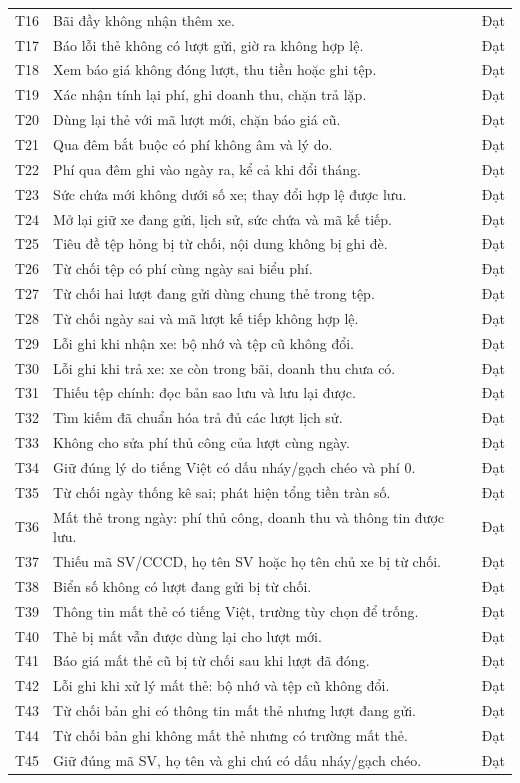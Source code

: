 \begin{longtable}{p{0.85cm} p{11.9cm} p{1.2cm}}
T16 & Bãi đầy không nhận thêm xe. & Đạt\\
T17 & Báo lỗi thẻ không có lượt gửi, giờ ra không hợp lệ. & Đạt\\
T18 & Xem báo giá không đóng lượt, thu tiền hoặc ghi tệp. & Đạt\\
T19 & Xác nhận tính lại phí, ghi doanh thu, chặn trả lặp. & Đạt\\
T20 & Dùng lại thẻ với mã lượt mới, chặn báo giá cũ. & Đạt\\
T21 & Qua đêm bắt buộc có phí không âm và lý do. & Đạt\\
T22 & Phí qua đêm ghi vào ngày ra, kể cả khi đổi tháng. & Đạt\\
T23 & Sức chứa mới không dưới số xe; thay đổi hợp lệ được lưu. & Đạt\\
T24 & Mở lại giữ xe đang gửi, lịch sử, sức chứa và mã kế tiếp. & Đạt\\
T25 & Tiêu đề tệp hỏng bị từ chối, nội dung không bị ghi đè. & Đạt\\
T26 & Từ chối tệp có phí cùng ngày sai biểu phí. & Đạt\\
T27 & Từ chối hai lượt đang gửi dùng chung thẻ trong tệp. & Đạt\\
T28 & Từ chối ngày sai và mã lượt kế tiếp không hợp lệ. & Đạt\\
T29 & Lỗi ghi khi nhận xe: bộ nhớ và tệp cũ không đổi. & Đạt\\
T30 & Lỗi ghi khi trả xe: xe còn trong bãi, doanh thu chưa có. & Đạt\\
T31 & Thiếu tệp chính: đọc bản sao lưu và lưu lại được. & Đạt\\
T32 & Tìm kiếm đã chuẩn hóa trả đủ các lượt lịch sử. & Đạt\\
T33 & Không cho sửa phí thủ công của lượt cùng ngày. & Đạt\\
T34 & Giữ đúng lý do tiếng Việt có dấu nháy/gạch chéo và phí 0. & Đạt\\
T35 & Từ chối ngày thống kê sai; phát hiện tổng tiền tràn số. & Đạt\\
T36 & Mất thẻ trong ngày: phí thủ công, doanh thu và thông tin được lưu. & Đạt\\
T37 & Thiếu mã SV/CCCD, họ tên SV hoặc họ tên chủ xe bị từ chối. & Đạt\\
T38 & Biển số không có lượt đang gửi bị từ chối. & Đạt\\
T39 & Thông tin mất thẻ có tiếng Việt, trường tùy chọn để trống. & Đạt\\
T40 & Thẻ bị mất vẫn được dùng lại cho lượt mới. & Đạt\\
T41 & Báo giá mất thẻ cũ bị từ chối sau khi lượt đã đóng. & Đạt\\
T42 & Lỗi ghi khi xử lý mất thẻ: bộ nhớ và tệp cũ không đổi. & Đạt\\
T43 & Từ chối bản ghi có thông tin mất thẻ nhưng lượt đang gửi. & Đạt\\
T44 & Từ chối bản ghi không mất thẻ nhưng có trường mất thẻ. & Đạt\\
T45 & Giữ đúng mã SV, họ tên và ghi chú có dấu nháy/gạch chéo. & Đạt\\
\end{longtable}\endgroup

